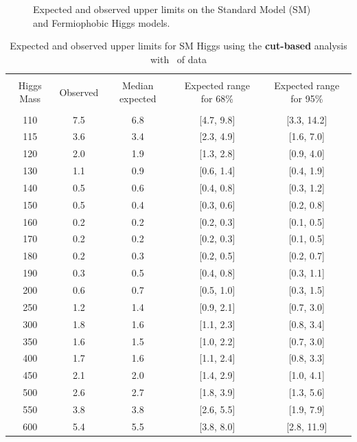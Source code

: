 \begin{figure}[!hbtp]

\caption{Expected and observed upper limits on the Standard Model (SM)
  and Fermiophobic Higgs models.}
\label{fig:uls}
\end{figure}


\begin{table}[!hbp]
\begin{center}
\begin{tabular}{c c c c c}
\hline
\vspace{-3mm} && \\
 Higgs Mass   & Observed & Median expected & Expected range for 68\% & Expected range for 95\%   \\
\vspace{-3mm} && \\
\hline
110 & 7.5 & 6.8 & [4.7, 9.8] & [3.3, 14.2] \\
115 & 3.6 & 3.4 & [2.3, 4.9] & [1.6, 7.0] \\
120 & 2.0 & 1.9 & [1.3, 2.8] & [0.9, 4.0] \\
130 & 1.1 & 0.9 & [0.6, 1.4] & [0.4, 1.9] \\
140 & 0.5 & 0.6 & [0.4, 0.8] & [0.3, 1.2] \\
150 & 0.5 & 0.4 & [0.3, 0.6] & [0.2, 0.8] \\
160 & 0.2 & 0.2 & [0.2, 0.3] & [0.1, 0.5] \\
170 & 0.2 & 0.2 & [0.2, 0.3] & [0.1, 0.5] \\
180 & 0.2 & 0.3 & [0.2, 0.5] & [0.2, 0.7] \\
190 & 0.3 & 0.5 & [0.4, 0.8] & [0.3, 1.1] \\
200 & 0.6 & 0.7 & [0.5, 1.0] & [0.3, 1.5] \\
250 & 1.2 & 1.4 & [0.9, 2.1] & [0.7, 3.0] \\
300 & 1.8 & 1.6 & [1.1, 2.3] & [0.8, 3.4] \\
350 & 1.6 & 1.5 & [1.0, 2.2] & [0.7, 3.0] \\
400 & 1.7 & 1.6 & [1.1, 2.4] & [0.8, 3.3] \\
450 & 2.1 & 2.0 & [1.4, 2.9] & [1.0, 4.1] \\
500 & 2.6 & 2.7 & [1.8, 3.9] & [1.3, 5.6] \\
550 & 3.8 & 3.8 & [2.6, 5.5] & [1.9, 7.9] \\
600 & 5.4 & 5.5 & [3.8, 8.0] & [2.8, 11.9] \\
\hline
\end{tabular}
\caption{Expected and observed upper limits for SM Higgs using the
  {\bf cut-based} analysis with \intlumi\ of data}
\label{tab:cutbase_uls}
\end{center}
\end{table}
